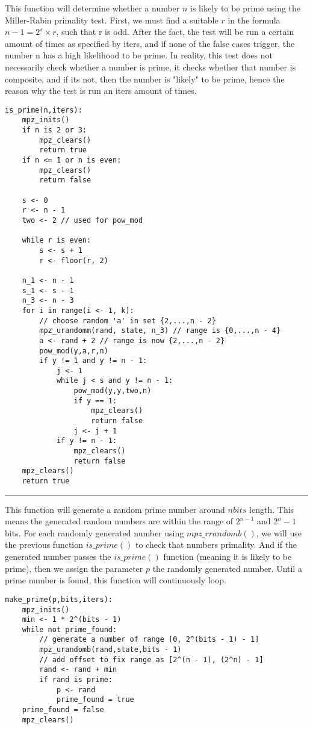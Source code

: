 \documentclass[
	12pt, %
]{fphw}
\begin{document}
This function will determine whether a number $n$ is likely to be prime using the Miller-Rabin primality test. First, we must find a suitable $r$ in the formula $n - 1 = 2^s \times r$, such that r is odd. After the fact, the test will be run a certain amount of times as specified by iters, and if none of the false cases trigger, the number n has a high likelihood to be prime. In reality, this test does not necessarily check whether a number is prime, it checks whether that number is composite, and if its not, then the number is "likely" to be prime, hence the reason why the test is run an iters amount of times.
\begin{lstlisting}[mathescape=true]
is_prime(n,iters):
	mpz_inits()
	if n is 2 or 3:
		mpz_clears()
		return true
	if n <= 1 or n is even:
		mpz_clears()
		return false
		
	s <- 0
	r <- n - 1
	two <- 2 // used for pow_mod
	
	while r is even:
		s <- s + 1
		r <- floor(r, 2)
	
	n_1 <- n - 1
	s_1 <- s - 1
	n_3 <- n - 3
	for i in range(i <- 1, k):
		// choose random 'a' in set {2,...,n - 2}
		mpz_urandomm(rand, state, n_3) // range is {0,...,n - 4}
		a <- rand + 2 // range is now {2,...,n - 2}
		pow_mod(y,a,r,n)
		if y != 1 and y != n - 1:
			j <- 1
			while j < s and y != n - 1:
				pow_mod(y,y,two,n)
				if y == 1:
					mpz_clears()
					return false
				j <- j + 1
			if y != n - 1:
				mpz_clears()
				return false
	mpz_clears()
	return true
\end{lstlisting}

\noindent\rule{6.3in}{0.4pt}

This function will generate a random prime number around $nbits$ length. This means the generated random numbers are within the range of $2^{n-1}$ and $2^n-1$ bits. For each randomly generated number using $mpz\_ rrandomb()$, we will use the previous function $is\_ prime()$ to check that numbers primality. And if the generated number passes the $is\_ prime()$ function (meaning it is likely to be prime), then we assign the parameter $p$ the randomly generated number. Until a prime number is found, this function will continuously loop.
\begin{lstlisting}
make_prime(p,bits,iters):
	mpz_inits()
	min <- 1 * 2^(bits - 1)
	while not prime_found:
		// generate a number of range [0, 2^(bits - 1) - 1]
		mpz_urandomb(rand,state,bits - 1)
		// add offset to fix range as [2^(n - 1), (2^n) - 1]
		rand <- rand + min
		if rand is prime:
			p <- rand
			prime_found = true
	prime_found = false
	mpz_clears()
\end{lstlisting}
\end{document}
